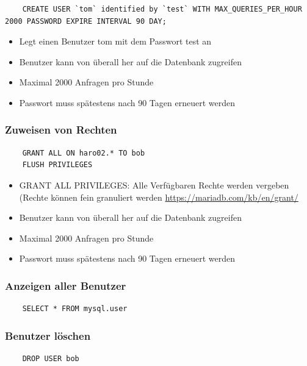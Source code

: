 \documentclass[10pt]{article}
\begin{document}
\vspace{20pt}
\begin{lstlisting}
    CREATE USER `tom` identified by `test` WITH MAX_QUERIES_PER_HOUR 2000 PASSWORD EXPIRE INTERVAL 90 DAY;
\end{lstlisting}
\begin{itemize}[topsep=-10pt]
    \item Legt einen Benutzer tom mit dem Passwort test an
    \item Benutzer kann von überall her auf die Datenbank zugreifen
    \item Maximal 2000 Anfragen pro Stunde
    \item Passwort muss spätestens nach 90 Tagen erneuert werden
\end{itemize}

\subsubsection{Zuweisen von Rechten}
\begin{lstlisting}
    GRANT ALL ON haro02.* TO bob
    FLUSH PRIVILEGES
\end{lstlisting}
\begin{itemize}[topsep=-10pt]
    \item GRANT ALL PRIVILEGES: Alle Verfügbaren Rechte werden vergeben (Rechte können fein granuliert werden \textrightarrow\space \url{https://mariadb.com/kb/en/grant/}
    \item Benutzer kann von überall her auf die Datenbank zugreifen
    \item Maximal 2000 Anfragen pro Stunde
    \item Passwort muss spätestens nach 90 Tagen erneuert werden
\end{itemize}

\subsubsection{Anzeigen aller Benutzer}
\begin{lstlisting}
    SELECT * FROM mysql.user
\end{lstlisting}

\subsubsection{Benutzer löschen}
\begin{lstlisting}
    DROP USER bob
\end{lstlisting}
\end{document}
